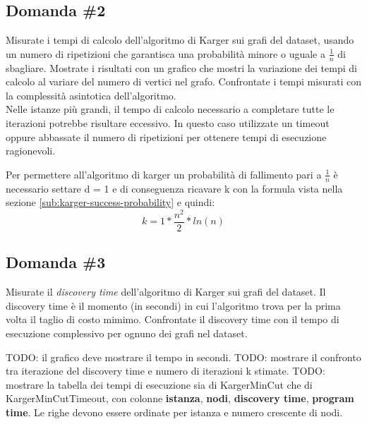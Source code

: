 \subsection{Domanda \#2}
\label{sec:question-2}

\begin{displayquote}
Misurate i tempi di calcolo dell'algoritmo di Karger sui grafi del
dataset, usando un numero di ripetizioni che garantisca una
probabilità minore o uguale a $\frac{1}{n}$ di sbagliare. Mostrate i
risultati con un grafico che mostri la variazione dei tempi di calcolo
al variare del numero di vertici nel grafo. Confrontate i tempi
misurati con la complessità asintotica dell'algoritmo. \\

\noindent Nelle istanze più grandi, il tempo di calcolo necessario a
completare tutte le iterazioni potrebbe risultare eccessivo. In questo
caso utilizzate un timeout oppure abbassate il numero di ripetizioni
per ottenere tempi di esecuzione ragionevoli.
\end{displayquote}

\noindent Per permettere all'algoritmo di karger un probabilità di
fallimento pari a $\frac{1}{n}$ è necessario settare d = 1 e di
conseguenza ricavare k con la formula vista nella sezione
\ref{sub:karger-success-probability} e quindi:
$$ k = 1 * \frac{n^2}{2} * ln(n)$$

\subsection{Domanda \#3}
\label{sec:question-3}

\begin{displayquote}
Misurate il \textit{discovery time} dell'algoritmo di Karger sui grafi
del dataset. Il discovery time è il momento (in secondi) in cui
l'algoritmo trova per la prima volta il taglio di costo mimimo.
Confrontate il discovery time con il tempo di esecuzione complessivo
per ognuno dei grafi nel dataset.
\end{displayquote}

TODO: il grafico deve mostrare il tempo in secondi.
TODO: mostrare il confronto tra iterazione del discovery time e numero di iterazioni k stimate.
TODO: mostrare la tabella dei tempi di esecuzione sia di KargerMinCut che di KargerMinCutTimeout, con colonne \textbf{istanza}, \textbf{nodi}, \textbf{discovery time}, \textbf{program time}.
Le righe devono essere ordinate per istanza e numero crescente di nodi. \\

